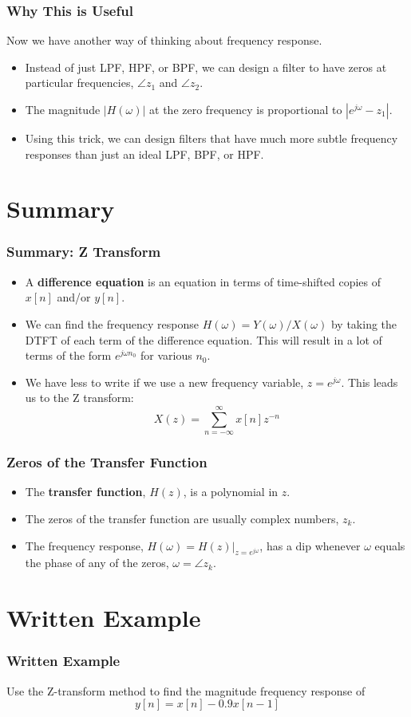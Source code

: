 \documentclass{beamer}
\begin{document}
\begin{frame}
  \frametitle{Why This is Useful}

  Now we have another way of thinking about frequency response.
  \begin{itemize}
    \item Instead of just LPF, HPF, or BPF, we can design a filter to have
      zeros at particular frequencies, $\angle z_1$ and $\angle z_2$.
    \item The magnitude $|H(\omega)|$ at the zero frequency is
      proportional to $|e^{j\omega}-z_1|$.
    \item Using this trick, we can design filters that have much more
      subtle frequency responses than just an ideal LPF, BPF, or HPF.
  \end{itemize}
\end{frame}

\section[Summary]{Summary}
\setcounter{subsection}{1}

\begin{frame}
  \frametitle{Summary: Z Transform}
  \begin{itemize}
  \item A {\bf difference equation} is an equation in terms of
    time-shifted copies of $x[n]$ and/or $y[n]$.
  \item We can find the frequency response
    $H(\omega)=Y(\omega)/X(\omega)$ by taking the DTFT of each term of
    the difference equation.  This will result in a lot of terms of
    the form $e^{j\omega n_0}$ for various $n_0$.
  \item We have less to write if we use a new frequency variable,
    $z=e^{j\omega}$.  This leads us to the Z transform:
    \[
    X(z) = \sum_{n=-\infty}^\infty x[n]z^{-n}
    \]
  \end{itemize}
\end{frame}

\begin{frame}
  \frametitle{Zeros of the Transfer Function}
  \begin{itemize}
  \item The {\bf transfer function}, $H(z)$, is a polynomial in $z$.
  \item The zeros of the transfer function are usually complex numbers, $z_k$.
  \item The frequency response, $H(\omega) = H(z)\vert_{z=e^{j\omega}}$, has a dip
    whenever $\omega$ equals the phase of any of the zeros, $\omega=\angle z_k$.
  \end{itemize}
\end{frame}

\section[Example]{Written Example}
\setcounter{subsection}{1}

\begin{frame}
  \frametitle{Written Example}

  Use the Z-transform method to find the magnitude frequency response
  of
  \[
  y[n] = x[n]-0.9x[n-1]
  \]
  
\end{frame}
\end{document}
